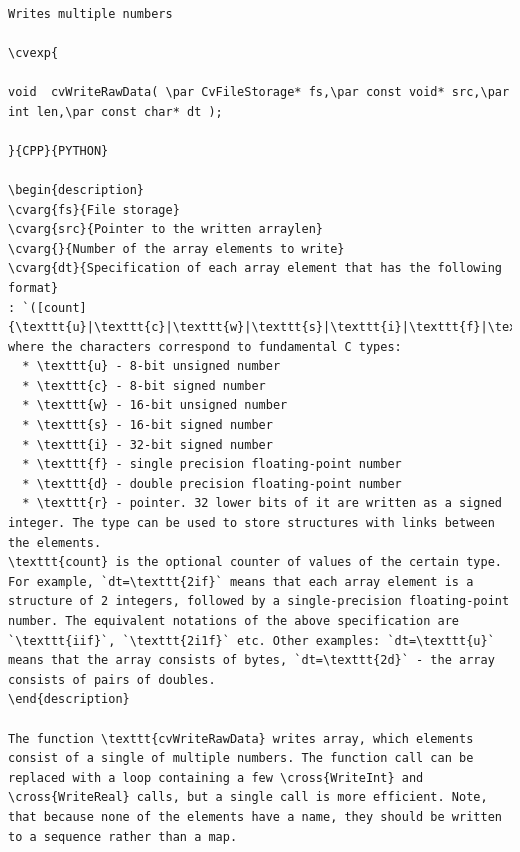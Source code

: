 \label{WriteRawData}
\begin{verbatim}

Writes multiple numbers

\cvexp{

void  cvWriteRawData( \par CvFileStorage* fs,\par const void* src,\par int len,\par const char* dt );

}{CPP}{PYTHON}

\begin{description}
\cvarg{fs}{File storage}
\cvarg{src}{Pointer to the written arraylen}
\cvarg{}{Number of the array elements to write}
\cvarg{dt}{Specification of each array element that has the following format}
: `([count]{\texttt{u}|\texttt{c}|\texttt{w}|\texttt{s}|\texttt{i}|\texttt{f}|\texttt{d}})...`, where the characters correspond to fundamental C types:
  * \texttt{u} - 8-bit unsigned number
  * \texttt{c} - 8-bit signed number
  * \texttt{w} - 16-bit unsigned number
  * \texttt{s} - 16-bit signed number
  * \texttt{i} - 32-bit signed number
  * \texttt{f} - single precision floating-point number
  * \texttt{d} - double precision floating-point number
  * \texttt{r} - pointer. 32 lower bits of it are written as a signed integer. The type can be used to store structures with links between the elements.
\texttt{count} is the optional counter of values of the certain type. For example, `dt=\texttt{2if}` means that each array element is a structure of 2 integers, followed by a single-precision floating-point number. The equivalent notations of the above specification are `\texttt{iif}`, `\texttt{2i1f}` etc. Other examples: `dt=\texttt{u}` means that the array consists of bytes, `dt=\texttt{2d}` - the array consists of pairs of doubles.
\end{description}

The function \texttt{cvWriteRawData} writes array, which elements consist of a single of multiple numbers. The function call can be replaced with a loop containing a few \cross{WriteInt} and \cross{WriteReal} calls, but a single call is more efficient. Note, that because none of the elements have a name, they should be written to a sequence rather than a map.


\end{verbatim}
\label{WriteFileNode}
